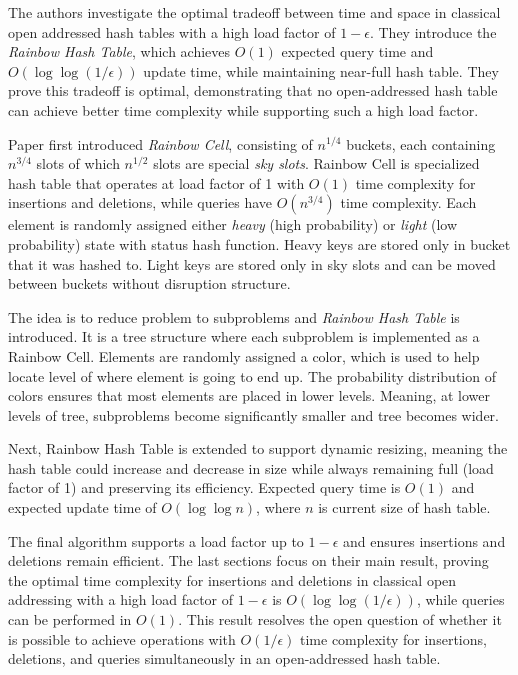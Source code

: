 
The authors investigate the optimal tradeoff between time and space in classical open addressed hash tables with a high load factor of $1 - \epsilon$. They introduce the \textit{Rainbow Hash Table}, which achieves $O(1)$ expected query time and $O(\log\log(1/\epsilon))$ update time, while maintaining near-full hash table. They prove this tradeoff is optimal, demonstrating that no open-addressed hash table can achieve better time complexity while supporting such a high load factor.

Paper first introduced \textit{Rainbow Cell}, consisting of $n^{1/4}$ buckets, each containing $n^{3/4}$ slots of which $n^{1/2}$ slots are special \textit{sky slots}. Rainbow Cell is specialized hash table that operates at load factor of 1 with $O(1)$ time complexity for insertions and deletions, while queries have $O(n^{3/4})$ time complexity. Each element is randomly assigned either \textit{heavy} (high probability) or \textit{light} (low probability) state with status hash function. Heavy keys are stored only in bucket that it was hashed to. Light keys are stored only in sky slots and can be moved between buckets without disruption structure.

The idea is to reduce problem to subproblems and \textit{Rainbow Hash Table} is introduced. It is a tree structure where each subproblem is implemented as a Rainbow Cell. Elements are randomly assigned a color, which is used to help locate level of where element is going to end up. The probability distribution of colors ensures that most elements are placed in lower levels. Meaning, at lower levels of tree, subproblems become significantly smaller and tree becomes wider. 

Next, Rainbow Hash Table is extended to support dynamic resizing, meaning the hash table could increase and decrease in size while always remaining full (load factor of 1) and preserving its efficiency. Expected query time is $O(1)$ and expected update time of $O(\log\log n)$, where $n$ is current size of hash table. 

The final algorithm supports a load factor up to $1 - \epsilon$ and ensures insertions and deletions remain efficient. The last sections focus on their main result, proving the optimal time complexity for insertions and deletions in classical open addressing with a high load factor of $1 - \epsilon$ is $O(\log\log(1/\epsilon))$, while queries can be performed in $O(1)$. This result resolves the open question of whether it is possible to achieve operations with $O(1/\epsilon)$ time complexity for insertions, deletions, and queries simultaneously in an open-addressed hash table.